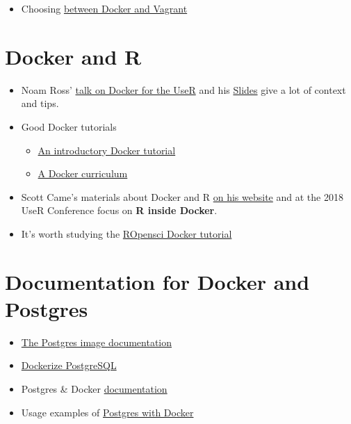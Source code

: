 \documentclass[]{book}
\providecommand{\tightlist}{%
  \setlength{\itemsep}{0pt}\setlength{\parskip}{0pt}}
\theoremstyle{definition}
\theoremstyle{definition}
\theoremstyle{definition}
\theoremstyle{remark}
\begin{document}
\begin{itemize}
\tightlist
\item
  Choosing
  \href{https://medium.com/@Mahmoud_Zalt/vagrant-vs-docker-679c9ce4231b}{between
  Docker and Vagrant}
\end{itemize}

\hypertarget{docker-and-r}{%
\section{Docker and R}\label{docker-and-r}}

\begin{itemize}
\tightlist
\item
  Noam Ross'
  \href{https://www.youtube.com/watch?v=803oZI5dvAU\&t=1}{talk on Docker
  for the UseR} and his
  \href{https://github.com/noamross/nyhackr-docker-talk}{Slides} give a
  lot of context and tips.
\item
  Good Docker tutorials

  \begin{itemize}
  \tightlist
  \item
    \href{https://docker-curriculum.com/}{An introductory Docker
    tutorial}
  \item
    \href{https://katacoda.com/courses/docker}{A Docker curriculum}
  \end{itemize}
\item
  Scott Came's materials about Docker and R
  \href{http://www.cascadia-analytics.com/2018/07/21/docker-r-p1.html}{on
  his website} and at the 2018 UseR Conference focus on \textbf{R inside
  Docker}.
\item
  It's worth studying the
  \href{https://ropenscilabs.github.io/r-docker-tutorial/}{ROpensci
  Docker tutorial}
\end{itemize}

\hypertarget{documentation-for-docker-and-postgres}{%
\section{Documentation for Docker and
Postgres}\label{documentation-for-docker-and-postgres}}

\begin{itemize}
\tightlist
\item
  \href{https://docs.docker.com/samples/library/postgres/}{The Postgres
  image documentation}
\item
  \href{https://docs.docker.com/engine/examples/postgresql_service/}{Dockerize
  PostgreSQL}
\item
  Postgres \& Docker
  \href{https://docs.docker.com/samples/library/postgres/\#postgres_db}{documentation}
\item
  Usage examples of
  \href{https://amattn.com/p/tutorial_postgresql_usage_examples_with_docker.html}{Postgres
  with Docker}
\end{itemize}
\end{document}
